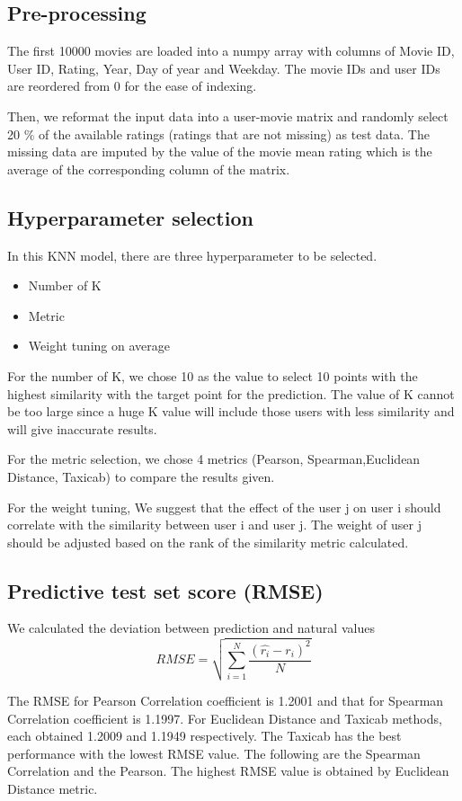 \documentclass[final]{cvpr}
\begin{document}
\subsection{Pre-processing}
The first 10000 movies are loaded into a numpy array with columns of Movie ID, User ID, Rating, Year, Day of year and Weekday. The movie IDs and user IDs are reordered from 0 for the ease of indexing.

Then, we reformat the input data into a user-movie matrix and randomly select 20 $\%$ of the available ratings (ratings that are not missing) as test data. The missing data are imputed by the value of the movie mean rating which is the average of the corresponding column of the matrix.

\subsection{Hyperparameter selection}
In this KNN model, there are three hyperparameter to be selected.
\begin{itemize}
	\item Number of K
	\item Metric 
	\item  Weight tuning on average
\end{itemize}

For the number of K, we chose 10 as the value to select 10 points with the highest similarity with the target point for the prediction. The value of K cannot be too large since a huge K value will include those users with less similarity and will give inaccurate results. 

For the metric selection, we chose 4 metrics (Pearson, Spearman,Euclidean Distance, Taxicab) to compare the results given.

For the weight tuning, We suggest that the effect of the user j on user i should correlate with the similarity between user i and user j. The weight of user j should be adjusted based on the rank of the similarity metric calculated.

\subsection{Predictive test set score (RMSE)}

We calculated the deviation between prediction and natural values
$$RMSE = \sqrt{\sum_{i=1}^{N} \frac {{(\hat{r_i}-r_i)}^2}{N}}$$

The RMSE for Pearson Correlation coefficient is 1.2001 and that for Spearman Correlation coefficient is 1.1997. For Euclidean Distance and Taxicab methods, each obtained 1.2009 and 1.1949 respectively. The Taxicab has the best performance with the lowest RMSE value. The following are the Spearman Correlation and the Pearson. The highest RMSE value is obtained by Euclidean Distance metric.

{\small
	
	
}
\end{document}
